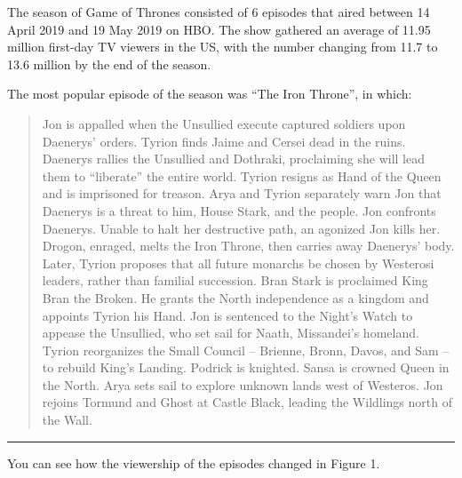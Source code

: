\documentclass[
  letterpaper,
  DIV=11,
  numbers=noendperiod]{scrartcl}
\newenvironment{Shaded}{\begin{snugshade}}{\end{snugshade}}
\newcommand{\AttributeTok}[1]{\textcolor[rgb]{0.40,0.45,0.13}{#1}}
\newcommand{\DecValTok}[1]{\textcolor[rgb]{0.68,0.00,0.00}{#1}}
\newcommand{\FunctionTok}[1]{\textcolor[rgb]{0.28,0.35,0.67}{#1}}
\newcommand{\NormalTok}[1]{\textcolor[rgb]{0.00,0.23,0.31}{#1}}
\newcommand{\SpecialCharTok}[1]{\textcolor[rgb]{0.37,0.37,0.37}{#1}}
\newcommand{\StringTok}[1]{\textcolor[rgb]{0.13,0.47,0.30}{#1}}
\begin{document}
The season of Game of Thrones consisted of 6 episodes that aired between
14 April 2019 and 19 May 2019 on HBO. The show gathered an average of
11.95 million first-day TV viewers in the US, with the number changing
from 11.7 to 13.6 million by the end of the season.

The most popular episode of the season was ``The Iron Throne'', in
which:

\begin{quote}
Jon is appalled when the Unsullied execute captured soldiers upon
Daenerys' orders. Tyrion finds Jaime and Cersei dead in the ruins.
Daenerys rallies the Unsullied and Dothraki, proclaiming she will lead
them to ``liberate'' the entire world. Tyrion resigns as Hand of the
Queen and is imprisoned for treason. Arya and Tyrion separately warn Jon
that Daenerys is a threat to him, House Stark, and the people. Jon
confronts Daenerys. Unable to halt her destructive path, an agonized Jon
kills her. Drogon, enraged, melts the Iron Throne, then carries away
Daenerys' body. Later, Tyrion proposes that all future monarchs be
chosen by Westerosi leaders, rather than familial succession. Bran Stark
is proclaimed King Bran the Broken. He grants the North independence as
a kingdom and appoints Tyrion his Hand. Jon is sentenced to the Night's
Watch to appease the Unsullied, who set sail for Naath, Missandei's
homeland. Tyrion reorganizes the Small Council -- Brienne, Bronn, Davos,
and Sam -- to rebuild King's Landing. Podrick is knighted. Sansa is
crowned Queen in the North. Arya sets sail to explore unknown lands west
of Westeros. Jon rejoins Tormund and Ghost at Castle Black, leading the
Wildlings north of the Wall.
\end{quote}

\begin{center}\rule{0.5\linewidth}{0.5pt}\end{center}

You can see how the viewership of the episodes changed in Figure 1.

\begin{Shaded}
\end{Shaded}
\end{document}
